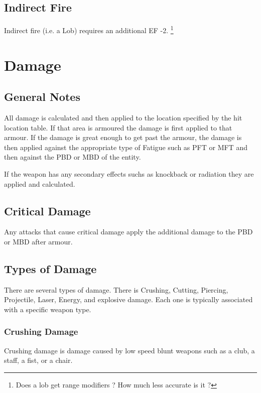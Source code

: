 \subsection{Indirect Fire}

Indirect fire (i.e. a Lob) requires an additional EF -2. 
\footnote{Does a lob get range modifiers ? How much less accurate is 
it ?}

\section{Damage}

\subsection{General Notes}

All damage is calculated and then applied to the location specified 
by the hit location table. If that area is armoured the damage is 
first applied to that armour. If the damage is great enough to get 
past the armour, the damage is then applied against the 
appropriate type of Fatigue such as PFT or MFT and then against the 
PBD or MBD of the entity. 

If the weapon has any secondary effects suchs as knockback or radiation
they are applied and calculated. 

\subsection{Critical Damage}

Any attacks that cause critical damage apply the additional damage to 
the PBD or MBD after armour.

\subsection{Types of Damage}

There are several types of damage. There is Crushing, Cutting, 
Piercing, Projectile, Laser, Energy, and explosive damage. Each one 
is typically associated with a specific weapon type. 

\subsubsection{Crushing Damage}

Crushing damage is damage caused by low speed blunt weapons such as 
a club, a staff, a fist, or a chair. 

